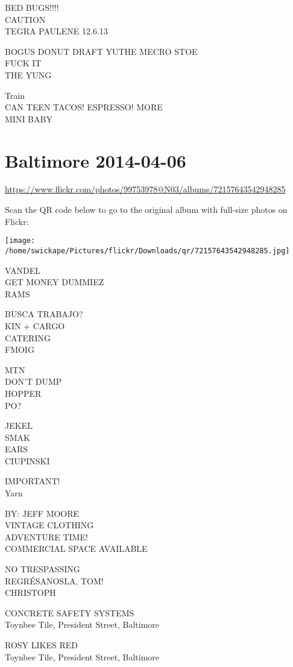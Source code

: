 \documentclass[10pt,letterpaper]{article}
\begin{document}
BED BUGS!!!!\\
CAUTION\\
TEGRA PAULENE 12.6.13

BOGUS DONUT DRAFT YUTHE MECRO STOE\\
FUCK IT\\
THE YUNG

Train\\
CAN TEEN TACOS! ESPRESSO! MORE\\
MINI BABY


\section*{Baltimore 2014-04-06}

\url{https://www.flickr.com/photos/99753978@N03/albums/72157643542948285}

Scan the QR code below to go to the original album with full-size photos on Flickr:

\texttt{[image: /home/swickape/Pictures/flickr/Downloads/qr/72157643542948285.jpg]}


VANDEL\\
GET MONEY DUMMIEZ\\
RAMS

BUSCA TRABAJO?\\
KIN + CARGO\\
CATERING\\
FMOIG

MTN\\
DON'T DUMP\\
HOPPER\\
PO?

JEKEL\\
SMAK\\
EARS\\
CIUPINSKI

IMPORTANT!\\
Yarn

BY: JEFF MOORE\\
VINTAGE CLOTHING\\
ADVENTURE TIME!\\
COMMERCIAL SPACE AVAILABLE

NO TRESPASSING\\
REGRÉSANOSLA, TOM!\\
CHRISTOPH

CONCRETE SAFETY SYSTEMS\\
Toynbee Tile, President Street, Baltimore

ROSY LIKES RED\\
Toynbee Tile, President Street, Baltimore
\end{document}

